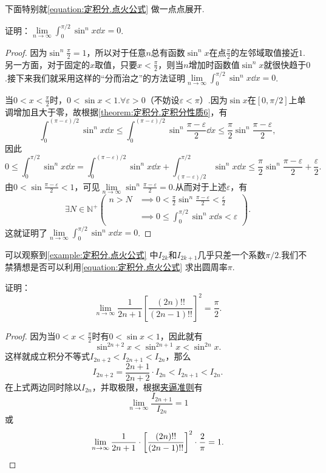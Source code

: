 下面特别就\cref{equation:定积分.点火公式} 做一点点展开.
\begin{example}
证明：\(\lim\limits_{n\to\infty} \int_0^{\pi/2} \sin^n x \dd{x} = 0\).
\begin{proof}
因为\(\sin^n\frac{\pi}{2}=1\)，所以对于任意\(n\)总有函数\(\sin^n x\)在点\(\frac{\pi}{2}\)的左邻域取值接近\(1\).另一方面，对于固定的\(x\)取值，只要\(x<\frac{\pi}{2}\)，则当\(n\)增加时函数值\(\sin^n x\)就很快趋于\(0\).接下来我们就采用这样的“分而治之”的方法证明\(\lim\limits_{n\to\infty} \int_0^{\pi/2} \sin^n x \dd{x} = 0\).

当\(0<x<\frac{\pi}{2}\)时，\(0<\sin x<1\).\(\forall\varepsilon>0\)（不妨设\(\varepsilon<\pi\)）.因为\(\sin x\)在\([0,\pi/2]\)上单调增加且大于零，故根据\cref{theorem:定积分.定积分性质6}，有\[
\int_0^{(\pi-\varepsilon)/2} \sin^n x \dd{x}
\leqslant
\int_0^{(\pi-\varepsilon)/2} \sin^n\frac{\pi-\varepsilon}{2} \dd{x}
\leqslant
\frac{\pi}{2} \sin^n\frac{\pi-\varepsilon}{2},
\]因此\[
0 \leqslant \int_0^{\pi/2} \sin^n x \dd{x}
= \int_0^{(\pi-\varepsilon)/2} \sin^n x \dd{x}
+ \int_{(\pi-\varepsilon)/2}^{\pi/2} \sin^n x \dd{x}
\leqslant \frac{\pi}{2} \sin^n\frac{\pi-\varepsilon}{2} + \frac{\varepsilon}{2}.
\]由\(0<\sin\frac{\pi-\varepsilon}{2}<1\)，可见\(\lim\limits_{n\to\infty} \sin^n\frac{\pi-\varepsilon}{2} = 0\).从而对于上述\(\varepsilon\)，有\[
\exists N\in\mathbb{N}^+ \left( \begin{array}{ll}
n>N &\implies 0<\frac{\pi}{2} \sin^n\frac{\pi-\varepsilon}{2}<\frac{\varepsilon}{2} \\
&\implies 0 \leqslant \int_0^{\pi/2} \sin^n x \dd{s} < \varepsilon
\end{array} \right).
\]这就证明了\(\lim\limits_{n\to\infty} \int_0^{\pi/2} \sin^n x \dd{x} = 0\).
\end{proof}
\end{example}

可以观察到\cref{example:定积分.点火公式} 中\(I_{2k}\)和\(I_{2k+1}\)几乎只差一个系数\(\pi/2\).我们不禁猜想是否可以利用\cref{equation:定积分.点火公式} 求出圆周率\(\pi\).
\begin{example}[Wallis公式]
证明：\begin{equation}\label{equation:定积分.Wallis公式}
\lim\limits_{n\to\infty} \frac{1}{2n+1} \left[
\frac{(2n)!!}{(2n-1)!!}
\right]^2 = \frac{\pi}{2}.
\end{equation}
\begin{proof}
因为当\(0<x<\frac{\pi}{2}\)时有\(0<\sin x<1\)，因此就有\[
\sin^{2n+2} x < \sin^{2n+1} x < \sin^{2n} x.
\]这样就成立积分不等式\(I_{2n+2} < I_{2n+1} < I_{2n}\)，那么\[
I_{2n+2} = \frac{2n+1}{2n+2} \cdot I_{2n}
< I_{2n+1} < I_{2n}.
\]在上式两边同时除以\(I_{2n}\)，并取极限，根据\hyperref[theorem:极限.夹逼准则]{夹逼准则}有\[
\lim\limits_{n\to\infty} \frac{I_{2n+1}}{I_{2n}} = 1
\]或\[
\lim\limits_{n\to\infty} \frac{1}{2n+1} \cdot \left[
	\frac{(2n)!!}{(2n-1)!!}
\right]^2 \cdot \frac{2}{\pi} = 1.
\qedhere
\]
\end{proof}
\end{example}

